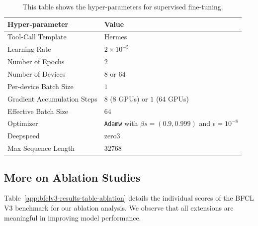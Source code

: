 \begin{table}[htbp]
\small
\centering
\caption{This table shows the hyper-parameters for supervised fine-tuning.}
\begin{tabular}{ll}
\toprule
\textbf{Hyper-parameter} & \textbf{Value} \\ \midrule
Tool-Call Template & Hermes \\
Learning Rate & $2 \times 10^{-5}$ \\
Number of Epochs & $2$ \\
Number of Devices & $8$ or $64$ \\
Per-device Batch Size & $1$ \\
Gradient Accumulation Steps & $8$ (8 GPUs) or $1$ (64 GPUs) \\
Effective Batch Size & $64$ \\
Optimizer & \texttt{Adamw} with $\beta s=(0.9,0.999)$ and $\epsilon=10^{-8}$\\
Deepspeed & zero3 \\
Max Sequence Length  & $32768$ \\ \bottomrule
\end{tabular}
\label{tab:fine-tune hyperparameters}
\end{table}


\subsection{More on Ablation Studies}
\label{app:more-on-ablations}

Table~\ref{app:bfclv3-results-table-ablation} details the individual scores of the BFCL V3 benchmark for our ablation analysis. We observe that all extensions are meaningful in improving model performance.

